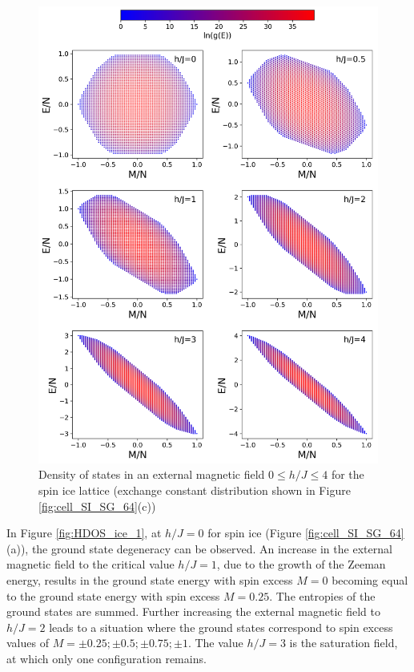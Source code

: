 \documentclass[utf8, babel, sor, jor, amsmath, amssymb, reprint]{elsarticle} %
\begin{document}
\begin{figure}[H]
	\centering
	\includegraphics[width=1\linewidth]{pictures/HDOS_SI_64_J0.png}
	\caption{Density of states in an external magnetic field $0\leq h/J \leq 4$ for the spin ice lattice (exchange constant distribution shown in Figure \ref{fig:cell_SI_SG_64}(c))}
	\label{fig:HDOS_ice}
\end{figure}

In Figure \ref{fig:HDOS_ice_1}, at $h/J=0$ for spin ice (Figure \ref{fig:cell_SI_SG_64}(a)), the ground state degeneracy can be observed. An increase in the external magnetic field to the critical value $h/J=1$, due to the growth of the Zeeman energy, results in the ground state energy with spin excess $M=0$ becoming equal to the ground state energy with spin excess $M=0.25$. The entropies of the ground states are summed.
Further increasing the external magnetic field to $h/J=2$ leads to a situation where the ground states correspond to spin excess values of $M=\pm0.25; \pm0.5; \pm0.75; \pm1$.
The value  $h/J=3$ is the saturation field, at which only one configuration remains.
\end{document}
